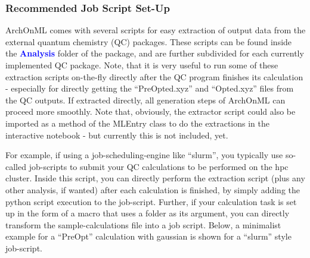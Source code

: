 \documentclass[12pt]{achemso}
\newcommand{\bl}[1]{\textcolor{blue}{\textbf{#1}}}
\begin{document}
\subsubsection{Recommended Job Script Set-Up}

\noindent ArchOnML comes with several scripts for easy extraction of output data from the external quantum chemistry (QC) packages. These scripts can be found inside the \bl{Analysis} folder of the package, and are further subdivided for each currently implemented QC package. Note, that it is very useful to run some of these extraction scripts on-the-fly directly after the QC program finishes its calculation - especially for directly getting the ``PreOpted.xyz'' and ``Opted.xyz'' files from the QC outputs. If extracted directly, all generation steps of ArchOnML can proceed more smoothly. Note that, obviously, the extractor script could also be imported as a method of the MLEntry class to do the extractions in the interactive notebook - but currently this is not included, yet.

\noindent For example, if using a job-scheduling-engine like ``slurm'', you typically use so-called job-scripts to submit your QC calculations to be performed on the hpc cluster. Inside this script, you can directly perform the extraction script (plus any other analysis, if wanted) after each calculation is finished, by simply adding the python script execution to the job-script. Further, if your calculation task is set up in the form of a macro that uses a folder as its argument, you can directly transform the sample-calculations file into a job script. Below, a minimalist example for a ``PreOpt'' calculation with gaussian is shown for a ``slurm'' style job-script.\\

\newpage
\end{document}
